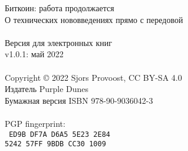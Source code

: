 \newpage
{\setlength{\parindent}{0cm}
\begin{vplace}
Биткоин: работа продолжается\\
О технических нововведениях прямо с передовой\\
\\
Версия для электронных книг\\
v1.0.1: май 2022\\
\\
Copyright © 2022 Sjors Provoost, CC BY-SA 4.0\\
Издатель Purple Dunes\\
Бумажная версия ISBN 978-90-9036042-3\\


\\

PGP fingerprint:\\
\texttt{
ED9B DF7A D6A5 5E23 2E84\\
5242 57FF 9BDB CC30 1009\\
}

\end{vplace}
}
